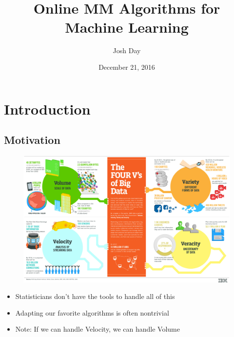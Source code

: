 \documentclass{beamer}
\title[Online MM]{Online MM Algorithms for Machine Learning}
\author{Josh Day}
\institute[NC State University]{NC State University \\ \textit{jtday2@ncsu.edu}}
\date{December 21, 2016}
\begin{document}
\begin{frame}
\titlepage
\end{frame}


\section{Introduction}
\subsection{Motivation}
\begin{frame}
  \begin{figure}
    \includegraphics[width=\linewidth]{figures/4vs.jpg}
  \end{figure}
\end{frame}
\begin{frame}
  \begin{itemize}
    \item Statisticians don't have the tools to handle all of this
    \item Adapting our favorite algorithms is often nontrivial
    \item Note: If we can handle Velocity, we can handle Volume
  \end{itemize}
\end{frame}

\end{document}
